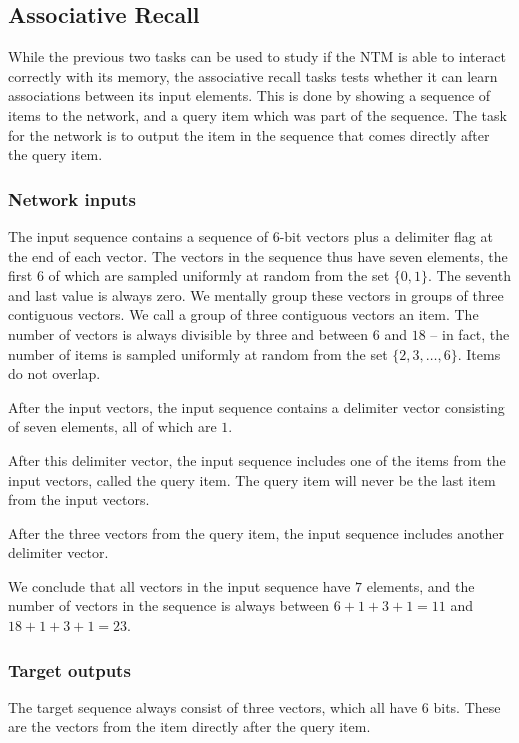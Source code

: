 \documentclass[12pt,twoside]{article}
\theoremstyle{plain}
\theoremstyle{definition}
\theoremstyle{remark}
\begin{document}
\subsection{Associative Recall}
While the previous two tasks can be used to study if the NTM is able to interact correctly with its memory, the associative recall tasks tests whether it can learn associations between its input elements. This is done by showing a sequence of items to the network, and a query item which was part of the sequence. The task for the network is to output the item in the sequence that comes directly after the query item.

\subsubsection{Network inputs}
The input sequence contains a sequence of 6-bit vectors plus a delimiter flag at the end of each vector. The vectors in the sequence thus have seven elements, the first $6$ of which are sampled uniformly at random from the set $\{0, 1\}$. The seventh and last value is always zero. We mentally group these vectors in groups of three contiguous vectors. We call a group of three contiguous vectors an item. The number of vectors is always divisible by three and between $6$ and $18$ -- in fact, the number of items is sampled uniformly at random from the set $\{2, 3, \ldots, 6\}$. Items do not overlap.

After the input vectors, the input sequence contains a delimiter vector consisting of seven elements, all of which are $1$.

After this delimiter vector, the input sequence includes one of the items from the input vectors, called the query item. The query item will never be the last item from the input vectors.

After the three vectors from the query item, the input sequence includes another delimiter vector.

We conclude that all vectors in the input sequence have $7$ elements, and the number of vectors in the sequence is always between $6 + 1 + 3 + 1 = 11$ and $18 + 1 + 3 + 1 = 23$.

\subsubsection{Target outputs}
The target sequence always consist of three vectors, which all have $6$ bits. These are the vectors from the item directly after the query item.
\end{document}

